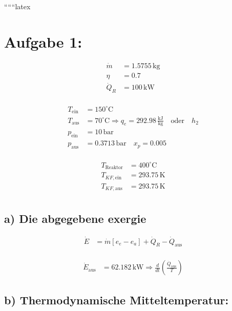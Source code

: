 
``````latex


\section*{Aufgabe 1:}

\begin{align*}
\dot{m} &= 1.5755 \, \text{kg} \\
\eta &= 0.7 \\
\dot{Q}_R &= 100 \, \text{kW} \\
\end{align*}

\begin{align*}
T_{\text{ein}} &= 150^\circ \text{C} \\
T_{\text{aus}} &= 70^\circ \text{C} \Rightarrow q_e = 292.98 \, \frac{\text{kJ}}{\text{kg}} \quad \text{oder} \quad h_2 \\
p_{\text{ein}} &= 10 \, \text{bar} \\
p_{\text{aus}} &= 0.3713 \, \text{bar} \quad x_p = 0.005 \\
\end{align*}

\begin{align*}
T_{\text{Reaktor}} &= 400^\circ \text{C} \\
T_{KF, \text{ein}} &= 293.75 \, \text{K} \\
T_{KF, \text{aus}} &= 293.75 \, \text{K} \\
\end{align*}

\subsection*{a) Die abgegebene exergie}

\begin{align*}
\dot{E} &= \dot{m} \left[ e_e - e_a \right] + \dot{Q}_R - \dot{Q}_{\text{aus}} \\
\end{align*}

\begin{align*}
\dot{E}_{\text{aus}} &= 62.182 \, \text{kW} \Rightarrow \frac{d}{dt} \left( \frac{\dot{Q}_{\text{aus}}}{T} \right)
\end{align*}

\subsection*{b) Thermodynamische Mitteltemperatur:}

